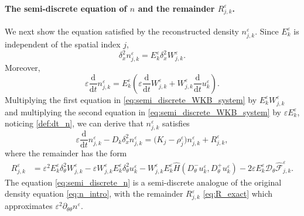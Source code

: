\documentclass[11pt]{article}
\begin{document}
\paragraph{The semi-discrete equation of $n$ and the remainder $R_{j,k}^\varepsilon$. }
We next show the equation satisfied by the reconstructed density
\(n_{j,k}^\varepsilon\). Since \(E_k^\varepsilon\) is independent of the
spatial index \(j\),
\[
\delta_x^2 n_{j,k}^\varepsilon
=
E_k^\varepsilon\delta_x^2W_{j,k}^\varepsilon .
\]
Moreover,
\begin{equation}\label{def:dt_n}
\varepsilon\frac{\mathrm d}{\mathrm dt}n_{j,k}^\varepsilon
=
E_k^\varepsilon
\left(
\varepsilon\frac{\mathrm d}{\mathrm dt}W_{j,k}^\varepsilon
+
W_{j,k}^\varepsilon
\frac{\mathrm d}{\mathrm dt}u_k^\varepsilon
\right).
\end{equation}
Multiplying the first equation in \eqref{eq:semi_discrete_WKB_system} by $E_k^\varepsilon W_{j,k}^\varepsilon$ and multiplying the second equation in  \eqref{eq:semi_discrete_WKB_system} by $\varepsilon E_k^\varepsilon$, 
noticing \eqref{def:dt_n},
we can derive that \(n_{j,k}^\varepsilon\) satisfies
\begin{equation}\label{eq:semi_discrete_n}
\varepsilon\frac{\mathrm d}{\mathrm dt} n_{j,k}^\varepsilon
-
D_k\delta_x^2 n_{j,k}^\varepsilon
=
\bigl(K_j-\rho_{j}^\varepsilon\bigr)n_{j,k}^\varepsilon
+
R_{j,k}^\varepsilon ,
\end{equation}
where the remainder has the form 
\begin{align} 
R_{j,k}^\varepsilon
&=
\varepsilon^2
E_k^\varepsilon
\delta_\theta^2 W_{j,k}^\varepsilon
-
\varepsilon
W_{j,k}^\varepsilon
E_k^\varepsilon
\delta_\theta^2 u_k^\varepsilon
-
W_{j,k}^\varepsilon
E_k^\varepsilon
\widehat H
\left(
D_\theta^-u_k^\varepsilon,
D_\theta^+u_k^\varepsilon
\right)
-
2\varepsilon
E_k^\varepsilon
\mathcal D_\theta
\widehat{\mathcal F}^\varepsilon_{j,k}.
\label{eq:R_exact}
\end{align}
The equation \eqref{eq:semi_discrete_n} is a semi-discrete analogue of the
original density equation \eqref{eq:n_intro}, with the remainder \(R_{j,k}^\varepsilon\) \eqref{eq:R_exact} which approximates
\(\varepsilon^2\partial_{\theta\theta}n^\varepsilon\). 





\end{document}
